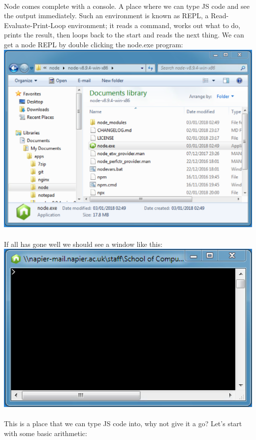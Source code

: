 \documentclass[10pt, a4paper, twosize]{article}
\begin{document}
\paragraph{} Node comes complete with a console. A place where we can type JS code and see the output immediately. Such an environment is known as REPL, a Read-Evaluate-Print-Loop environment; it reads a command, works out what to do, prints the result, then loops back to the start and reads the next thing. We can get a node REPL by double clicking the node.exe program:\\

\includegraphics[width=.8\textwidth]{images/node_executable}

\paragraph{} If all has gone well we should see a window like this:\\

\includegraphics[width=.8\textwidth]{images/node_repl}

\paragraph{} This is a place that we can type JS code into, why not give it a go? Let's start with some basic arithmetic:\\
\end{document}
